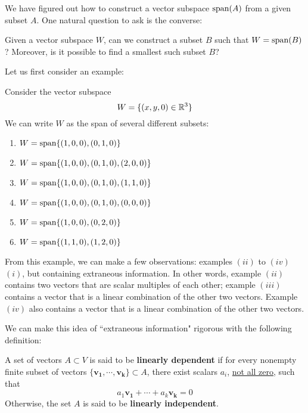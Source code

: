     We have figured out how to construct a vector subspace $\textnormal{span}(A)$ from a given subset $A$.  One natural question to ask is the converse:
    
    \begin{motivating}
     Given a vector subspace $W$, can we construct a subset $B$ such that $W = \textnormal{span}(B)$?  Moreover, is it possible to find a smallest such subset $B$?  
    \end{motivating}
    
    Let us first consider an example:
    
    \begin{example}
    Consider the vector subspace $$W = \{(x, y, 0) \in \mathbb{R}^3 \}$$
    We can write $W$ as the span of several different subsets:
    \begin{enumerate}[label=(\roman*)]
        \item $W= \textnormal{span}\{(1,0,0), (0,1,0)\}$
        \item $W= \textnormal{span}\{(1,0,0), (0,1,0), (2,0,0)\}$
        \item $W= \textnormal{span}\{(1,0,0), (0,1,0),(1,1,0)\}$
        \item $W= \textnormal{span}\{(1,0,0), (0,1,0), (0,0,0)\}$
        \item $W= \textnormal{span}\{(1,0,0),(0,2,0)\}$
        \item $W= \textnormal{span}\{(1,1,0),(1,2,0)\}$
    \end{enumerate}
    
    \end{example}
    
    From this example, we can make a few observations: examples $(ii)$ to $(iv)$  $(i)$, but containing extraneous information.  In other words, example $(ii)$ contains two vectors that are scalar multiples of each other; example $(iii)$ contains a vector that is a linear combination of the other two vectors.  Example $(iv)$ also contains a vector that is a linear combination of the other two vectors. 
    
    We can make this idea of ``extraneous information" rigorous with the following definition:
    
     \begin{definition}
    A set of vectors $A \subset V$ is said to be \textbf{linearly dependent} if for every nonempty finite subset of vectors $\{\bm{v_1}, \cdots, \bm{v_k}\} \subset A$, there exist scalars $a_i$, \underline{not all zero}, such that $$a_1\bm{v_1} + \cdots + a_k\bm{v_k} = 0$$ Otherwise, the set $A$ is said to be \textbf{linearly independent}.
    \end{definition}
    

